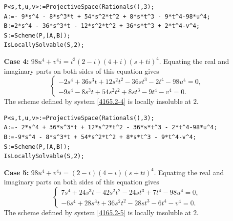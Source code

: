 \documentclass[a4paper,12pt,english,reqno]{amsart}
\begin{document}
\begin{lstlisting}
P<s,t,u,v>:=ProjectiveSpace(Rationals(),3);
A:=- 9*s^4 - 8*s^3*t + 54*s^2*t^2 + 8*s*t^3 - 9*t^4-98*u^4;
B:=2*s^4 - 36*s^3*t - 12*s^2*t^2 + 36*s*t^3 + 2*t^4-v^4;
S:=Scheme(P,[A,B]);
IsLocallySolvable(S,2);
\end{lstlisting}

{\bf Case 4:} $98u^4+v^4i=i^3(2-i)(4+i)(s+ti)^4$. Equating the real and imaginary parts on both sides of this equation gives
\begin{equation}\label{4165.2-4}
\begin{cases}
-2s^4 + 36s^3t + 12s^2t^2 - 36st^3 - 2t^4 - 98u^4=0,\\
-9s^4 - 8s^3t + 54s^2t^2 + 8st^3 - 9t^4 - v^4=0.
\end{cases}
\end{equation}
The scheme defined by system \eqref{4165.2-4} is locally insoluble at $2$.

\begin{lstlisting}
P<s,t,u,v>:=ProjectiveSpace(Rationals(),3);
A:=- 2*s^4 + 36*s^3*t + 12*s^2*t^2 - 36*s*t^3 - 2*t^4-98*u^4;
B:=-9*s^4 - 8*s^3*t + 54*s^2*t^2 + 8*s*t^3 - 9*t^4-v^4;
S:=Scheme(P,[A,B]);
IsLocallySolvable(S,2);
\end{lstlisting}

{\bf Case 5:} $98u^4+v^4i=(2-i)(4-i)(s+ti)^4$. Equating the real and imaginary parts on both sides of this equation gives
\begin{equation}\label{4165.2-5}
\begin{cases}
7s^4 + 24s^3t - 42s^2t^2 - 24st^3 + 7t^4 - 98u^4=0,\\
-6s^4 + 28s^3t + 36s^2t^2 - 28st^3 - 6t^4 - v^4=0.
\end{cases}
\end{equation}
The scheme defined by system \eqref{4165.2-5} is locally insoluble at $2$.
\end{document}
